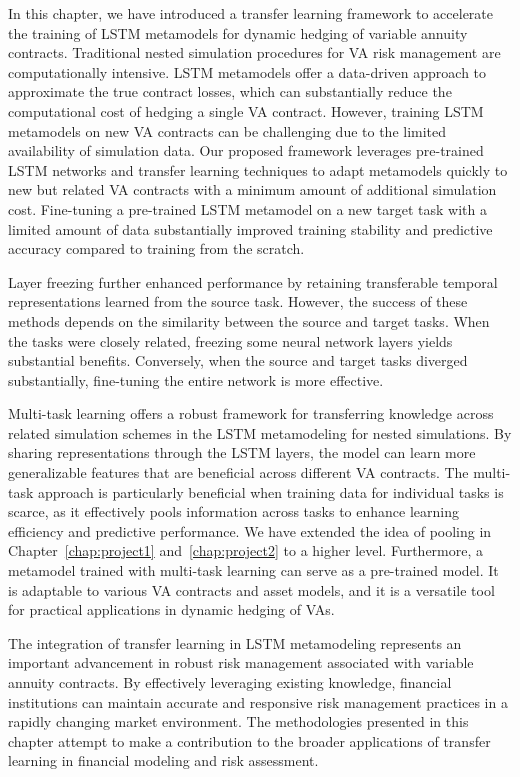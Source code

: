 In this chapter, we have introduced a transfer learning framework to accelerate the training of LSTM metamodels for dynamic hedging of variable annuity contracts.
Traditional nested simulation procedures for VA risk management are computationally intensive.
LSTM metamodels offer a data-driven approach to approximate the true contract losses, which can substantially reduce the computational cost of hedging a single VA contract.
However, training LSTM metamodels on new VA contracts can be challenging due to the limited availability of simulation data.
Our proposed framework leverages pre-trained LSTM networks and transfer learning techniques to adapt metamodels quickly to new but related VA contracts with a minimum amount of additional simulation cost.
Fine-tuning a pre-trained LSTM metamodel on a new target task with a limited amount of data substantially improved training stability and predictive accuracy compared to training from the scratch. 

Layer freezing further enhanced performance by retaining transferable temporal representations learned from the source task. 
However, the success of these methods depends on the similarity between the source and target tasks. 
When the tasks were closely related, freezing some neural network layers yields substantial benefits. 
Conversely, when the source and target tasks diverged substantially, fine-tuning the entire network is more effective.

Multi-task learning offers a robust framework for transferring knowledge across related simulation schemes in the LSTM metamodeling for nested simulations. 
By sharing representations through the LSTM layers, the model can learn more generalizable features that are beneficial across different VA contracts. 
The multi-task approach is particularly beneficial when training data for individual tasks is scarce, as it effectively pools information across tasks to enhance learning efficiency and predictive performance.
We have extended the idea of pooling in Chapter~\ref{chap:project1} and~\ref{chap:project2} to a higher level.
Furthermore, a metamodel trained with multi-task learning can serve as a pre-trained model. 
It is adaptable to various VA contracts and asset models, and it is a versatile tool for practical applications in dynamic hedging of VAs.

The integration of transfer learning in LSTM metamodeling represents an important advancement in robust risk management associated with variable annuity contracts.
By effectively leveraging existing knowledge, financial institutions can maintain accurate and responsive risk management practices in a rapidly changing market environment. 
The methodologies presented in this chapter attempt to make a contribution to the broader applications of transfer learning in financial modeling and risk assessment.

